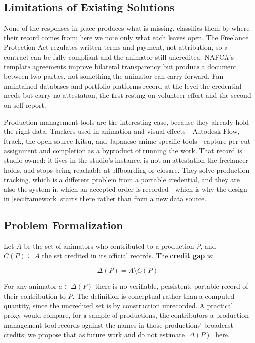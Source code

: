 \subsection{Limitations of Existing Solutions}
\label{subsec:existing_limitations}

None of the responses in place produces what is missing.
 classifies them by where their record comes from; here we
note only what each leaves open. The Freelance Protection Act regulates written
terms and payment, not attribution, so a contract can be fully compliant and the
animator still uncredited. NAFCA's template agreements improve bilateral
transparency but produce a document between two parties, not something the
animator can carry forward. Fan-maintained databases and portfolio platforms
record at the level the credential needs but carry no attestation, the first
resting on volunteer effort and the second on self-report.

Production-management tools are the interesting case, because they already hold
the right data. Trackers used in animation and visual effects---Autodesk Flow,
ftrack, the open-source Kitsu, and Japanese anime-specific tools---capture
per-cut assignment and completion as a byproduct of running the work. That record
is studio-owned: it lives in the studio's instance, is not an attestation the
freelancer holds, and stops being reachable at offboarding or closure. They solve
production tracking, which is a different problem from a portable credential, and
they are also the system in which an accepted order is recorded---which is why the
design in \cref{sec:framework} starts there rather than from a new data source.

\subsection{Problem Formalization}
\label{subsec:formalization}

Let $A$ be the set of animators who contributed to a production $P$, and
$C(P) \subseteq A$ the set credited in its official records. The \textbf{credit gap} is:

\begin{equation}
  \Delta(P) = A \setminus C(P)
  \label{eq:credit_gap}
\end{equation}

For any animator $a \in \Delta(P)$ there is no verifiable, persistent, portable record of
their contribution to $P$. The definition is conceptual rather than a computed quantity,
since the uncredited set is by construction unrecorded. A practical proxy would compare,
for a sample of productions, the contributors a production-management tool records against
the names in those productions' broadcast credits; we propose that as future work and do
not estimate $|\Delta(P)|$ here.

